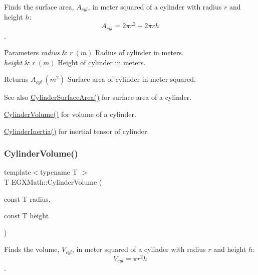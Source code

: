 Finds the surface area, $A_{cyl}$, in meter squared of a cylinder with radius $r$ and height $h$\+: \[ A_{cyl}=2\pi r^2 + 2\pi r h \]. 


\begin{DoxyParams}{Parameters}
{\em radius} & $ r\ (m)$ Radius of cylinder in meters. \\
\hline
{\em height} & $ r\ (m)$ Height of cylinder in meters. \\
\hline
\end{DoxyParams}
\begin{DoxyReturn}{Returns}
$ A_{cyl}\ (m^2)$ Surface area of cylinder in meter squared. 
\end{DoxyReturn}
\begin{DoxySeeAlso}{See also}
\mbox{\hyperlink{group___e_g_x_math-_geometry-3_d-_cylinder_gaf14619f5d525e14150a43b9898adb258}{Cylinder\+Surface\+Area()}} for surface area of a cylinder. 

\mbox{\hyperlink{group___e_g_x_math-_geometry-3_d-_cylinder_ga9d1aa08f778f9ccbd79953063f11bc9b}{Cylinder\+Volume()}} for volume of a cylinder. 

\mbox{\hyperlink{group___e_g_x_math-_geometry-3_d-_cylinder_ga5d9256549303e88a49b72e3d4c2c4a6d}{Cylinder\+Inertia()}} for inertial tensor of cylinder. 
\end{DoxySeeAlso}
\mbox{\label{group___e_g_x_math-_geometry-3_d-_cylinder_ga9d1aa08f778f9ccbd79953063f11bc9b}} 
\subsubsection{\texorpdfstring{Cylinder\+Volume()}{CylinderVolume()}}
{\footnotesize\ttfamily template$<$typename T $>$ \\
T E\+G\+X\+Math\+::\+Cylinder\+Volume (\begin{DoxyParamCaption}\item[{const T}]{radius,  }\item[{const T}]{height }\end{DoxyParamCaption})}



Finds the volume, $V_{cyl}$, in meter squared of a cylinder with radius $r$ and height $h$\+: \[ V_{cyl}=\pi r^2 h\]. 


